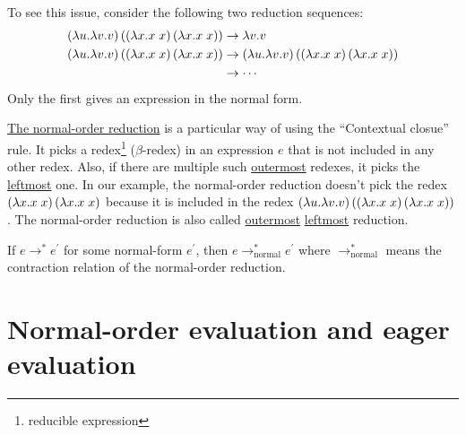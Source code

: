 \begin{enumcirc}
	To see this issue, consider the following two reduction sequences:
	\begin{align*}
		\left( \lambda u. \lambda v. v \right)
		\left( 
			\left( \lambda x. x \; x \right)
			\left( \lambda x. x \; x \right)
		 \right)
		 & \rightarrow \lambda v. v \\
		\left( \lambda u. \lambda v. v \right)
		\left( 
			\left( \lambda x. x \; x \right)
			\left( \lambda x. x \; x \right)
		 \right)
		 & \rightarrow
		\left( \lambda u. \lambda v. v \right)
		\left( 
			\left( \lambda x. x \; x \right)
			\left( \lambda x. x \; x \right)
		 \right)                           \\
		 & \rightarrow \cdots
	\end{align*}
	Only the first gives an expression in the normal form.
	\item
	\ul{The normal-order reduction} is a particular way of using the ``Contextual closue'' rule.
	It picks a redex\footnote{reducible expression} ($\beta$-redex) in an
	expression $e$ that is not included in any other redex.
	Also, if there are multiple such \ul{outermost} redexes, it picks the
	\ul{leftmost} one.
	In our example, the normal-order reduction doesn't pick the redex
	$\left( \lambda x. x \; x \right) \left( \lambda x. x \; x \right)$
	because it is included in the redex
	$\left( \lambda u. \lambda v. v \right) \left( \left( \lambda x. x \; x \right) \left( \lambda x. x \; x \right) \right)$.
	The normal-order reduction is also called \ul{outermost} \ul{leftmost}
	reduction.
	\begin{property}
		If $e \rightarrow^* e^\prime$ for some normal-form $e^\prime$,
		then $e \rightarrow^*_\text{normal} e^\prime$
		where $\rightarrow^*_\text{normal}$ means the contraction relation of the
		normal-order reduction.
	\end{property}
\end{enumcirc}

\section{Normal-order evaluation and eager evaluation}

